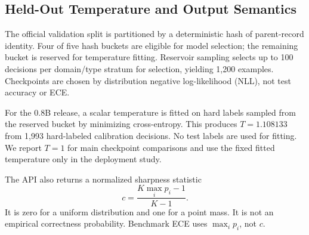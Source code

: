 \subsection{Held-Out Temperature and Output Semantics}
\label{sec:temperature}
The official validation split is partitioned by a deterministic hash of parent-record identity. Four of five hash buckets are eligible for model selection; the remaining bucket is reserved for temperature fitting. Reservoir sampling selects up to 100 decisions per domain/type stratum for selection, yielding 1,200 examples. Checkpoints are chosen by distribution negative log-likelihood (NLL), not test accuracy or ECE.

For the 0.8B release, a scalar temperature is fitted on hard labels sampled from the reserved bucket by minimizing cross-entropy. This produces $T=1.108133$ from 1,993 hard-labeled calibration decisions. No test labels are used for fitting. We report $T=1$ for main checkpoint comparisons and use the fixed fitted temperature only in the deployment study.

The API also returns a normalized sharpness statistic
\begin{equation}
c=\frac{K\max_i p_i-1}{K-1}.\label{eq:confidence}
\end{equation}
It is zero for a uniform distribution and one for a point mass. It is not an empirical correctness probability. Benchmark ECE uses $\max_i p_i$, not $c$.
